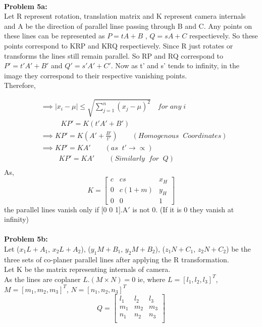 \documentclass[a4paper]{article}
\begin{document}
\maketitle
\hrulefill
\\
\textbf{Problem 5a:} \\
Let R represent rotation, translation matrix and K represent camera internals and A be the direction of parallel linse passing through B and C. Any points on these lines can be represented as $P=tA+B$ , $Q=sA+C$ respectievely. So these points correspond to KRP and KRQ respectievely. Since R just rotates or transforms the lines still remain parallel. So RP and RQ correspond to $P' = t'A'+B'$ and $Q'=s'A'+C'$. Now as t' and s' tends to infinity, in the image they correspond to their respective vanishing points.\\
Therefore, 

\begin{equation*}
\begin{split}
&\implies |x_i- \mu| \leq \sqrt{\sum_{j=1}^{n} (x_j-\mu)^2 } \quad for\; any\; i\\
& \;\;\;\qquad KP' = K(t'A'+B')\\
&\implies KP' = K(A'+\frac{B'}{t'}) \qquad (Homogenous\;\; Coordinates)\\ 
&\implies KP' = KA' \qquad (as \;\;t'\rightarrow\varpropto)\\
&\qquad \;\; KP' = KA' \qquad (Similarly\;\; for\;\; Q)\\
\end{split}
\end{equation*}
As, 
\[
K=
\begin{bmatrix}
    c       & cs & x_{H}  \\
    0       & c(1+m) & y_{H}  \\
    0       & 0 & 1
\end{bmatrix}
\]
the parallel lines vanish only if [0 0 1].A$'$ is not 0. (If it is 0 they vanish at infinity)\\ \\
\textbf{Problem 5b:}\\
Let ($x_1L+A_1$, $x_2L+A_2$), ($y_1M+B_1$, $y_2M+B_2$), ($z_1N+C_1$, $z_2N+C_2$) be the three sets of co-planer parallel lines after applying the R transformation.\\
Let K be the matrix representing internals of camera.\\
As the lines are coplaner $L.(M \times N) = 0 $  ie, where $L = [l_1,l_2,l_3]^T$, $M = [m_1,m_2,m_3]^T$, $N = [n_1,n_2,n_3]^T$
\[
Q=
\begin{bmatrix}
    l_1       & l_2 & l_3  \\
    m_1       & m_2 & m_3  \\
    n_1       & n_2 & n_3  \\
\end{bmatrix}
\]
\end{document}
